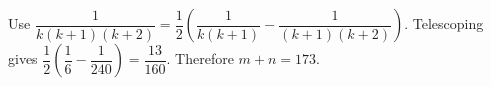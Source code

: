 Use $\dfrac{1}{k(k+1)(k+2)}=\dfrac{1}{2}(\dfrac{1}{k(k+1)}-\dfrac{1}{(k+1)(k+2)})$. Telescoping gives $\dfrac{1}{2}(\dfrac{1}{6}-\dfrac{1}{240})=\dfrac{13}{160}$. Therefore $\boxed{m+n=173}$.
